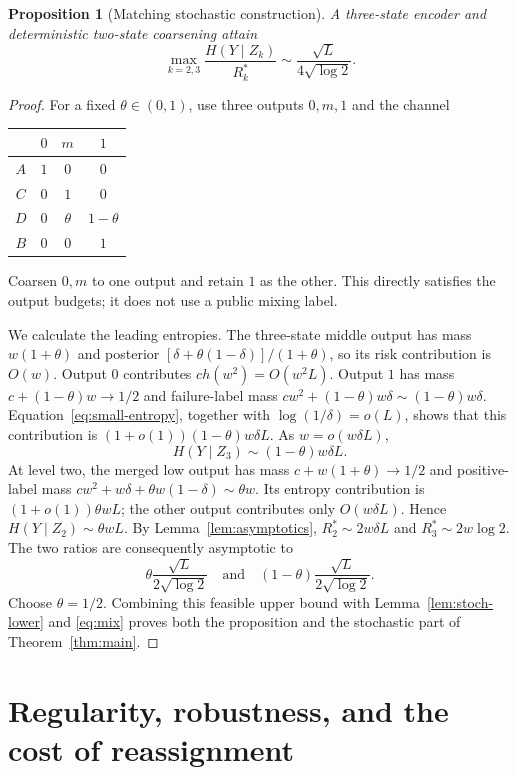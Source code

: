 \documentclass[11pt]{article}
\newtheorem{proposition}[theorem]{Proposition}
\theoremstyle{remark}\newtheorem{remark}[theorem]{Remark}
\begin{document}
\begin{proposition}[Matching stochastic construction]
\label{prop:stoch-upper}
A three-state encoder and deterministic two-state coarsening attain
\[
 \max_{k=2,3}\frac{H(Y\mid Z_k)}{R_k^*}
 \sim\frac{\sqrt L}{4\sqrt{\log2}}.
\]
\end{proposition}
\begin{proof}
For a fixed $\theta\in(0,1)$, use three outputs $0,m,1$ and the channel
\begin{center}
\begin{tabular}{c|ccc}
 & $0$ & $m$ & $1$\\\hline
$A$ & $1$ & $0$ & $0$\\
$C$ & $0$ & $1$ & $0$\\
$D$ & $0$ & $\theta$ & $1-\theta$\\
$B$ & $0$ & $0$ & $1$
\end{tabular}
\end{center}
Coarsen $0,m$ to one output and retain $1$ as the other. This directly
satisfies the output budgets; it does not use a public mixing label.

We calculate the leading entropies. The three-state middle output has mass
$w(1+\theta)$ and posterior
$[\delta+\theta(1-\delta)]/(1+\theta)$, so its risk contribution is
$O(w)$. Output $0$ contributes $c h(w^2)=O(w^2L)$. Output $1$ has mass
$c+(1-\theta)w\to1/2$ and failure-label mass
$c w^2+(1-\theta)w\delta\sim(1-\theta)w\delta$.
Equation~\eqref{eq:small-entropy}, together with
$\log(1/\delta)=o(L)$, shows that this contribution is
$(1+o(1))(1-\theta)w\delta L$. As $w=o(w\delta L)$,
\[
 H(Y\mid Z_3)\sim(1-\theta)w\delta L.
\]
At level two, the merged low output has mass
$c+w(1+\theta)\to1/2$ and positive-label mass
$c w^2+w\delta+\theta w(1-\delta)\sim\theta w$.
Its entropy contribution is $(1+o(1))\theta wL$; the other output
contributes only $O(w\delta L)$. Hence
$H(Y\mid Z_2)\sim\theta wL$.
By Lemma~\ref{lem:asymptotics}, $R_2^*\sim2w\delta L$ and
$R_3^*\sim2w\log2$. The two ratios are consequently asymptotic to
\[
 \theta\frac{\sqrt L}{2\sqrt{\log2}}
 \quad\text{and}\quad
 (1-\theta)\frac{\sqrt L}{2\sqrt{\log2}}.
\]
Choose $\theta=1/2$. Combining this feasible upper bound with
Lemma~\ref{lem:stoch-lower} and \eqref{eq:mix} proves both the proposition
and the stochastic part of Theorem~\ref{thm:main}.
\end{proof}

\section{Regularity, robustness, and the cost of reassignment}

\end{document}
